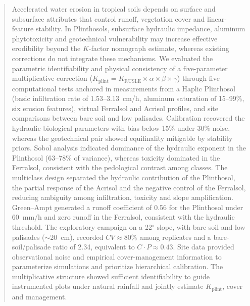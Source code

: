 \documentclass[preprint,review,12pt,authoryear]{elsarticle}
\begin{document}
\begin{frontmatter}
\begin{abstract}
Accelerated water erosion in tropical soils depends on surface and subsurface attributes that control runoff, vegetation cover and linear-feature stability. In Plinthosols, subsurface hydraulic impedance, aluminum phytotoxicity and geotechnical vulnerability may increase effective erodibility beyond the $K$-factor nomograph estimate, whereas existing corrections do not integrate these mechanisms. We evaluated the parametric identifiability and physical consistency of a five-parameter multiplicative correction ($K_{\mathrm{plint}} = K_{\mathrm{RUSLE}} \times \alpha \times \beta \times \gamma$) through five computational tests anchored in measurements from a Haplic Plinthosol (basic infiltration rate of 1.53--3.13~cm/h, aluminum saturation of 15--99\%, six erosion features), virtual Ferralsol and Acrisol profiles, and site comparisons between bare soil and low palisades. Calibration recovered the hydraulic-biological parameters with bias below 15\% under 30\% noise, whereas the geotechnical pair showed equifinality mitigable by stability priors. Sobol analysis indicated dominance of the hydraulic exponent in the Plinthosol (63--78\% of variance), whereas toxicity dominated in the Ferralsol, consistent with the pedological contrast among classes. The multiclass design separated the hydraulic contribution of the Plinthosol, the partial response of the Acrisol and the negative control of the Ferralsol, reducing ambiguity among infiltration, toxicity and slope amplification. Green--Ampt generated a runoff coefficient of 0.56 for the Plinthosol under 60~mm/h and zero runoff in the Ferralsol, consistent with the hydraulic threshold. The exploratory campaign on a 22$^{\circ}$ slope, with bare soil and low palisades ($\sim$20~cm), recorded $CV \approx 80\%$ among replicates and a bare-soil/palisade ratio of 2.34, equivalent to $C \cdot P \approx 0.43$. Site data provided observational noise and empirical cover-management information to parameterize simulations and prioritize hierarchical calibration. The multiplicative structure showed sufficient identifiability to guide instrumented plots under natural rainfall and jointly estimate $K_{\mathrm{plint}}$, cover and management.
\end{abstract}


\end{frontmatter}
\end{document}

